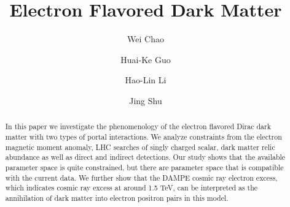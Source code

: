 \documentclass[aps,prd,letterpaper,showpacs,twocolumn,preprintnumbers,floatfix,superscriptaddress]{revtex4-1}
\begin{document}
\title{Electron Flavored Dark Matter}
\author{Wei Chao}
\author{Huai-Ke Guo}
\author{Hao-Lin Li}
\author{Jing Shu}


\begin{abstract}
In this paper we investigate the phenomenology of the electron flavored Dirac dark matter with two types of portal interactions. We analyze constraints from the electron magnetic moment anomaly, LHC searches of singly charged scalar, dark matter relic abundance as well as direct and indirect detections. 
Our study shows that the available parameter space is quite constrained, but there are parameter space that is compatible with the current data.
We further show that the DAMPE cosmic ray electron excess, which indicates cosmic ray excess at around 1.5 TeV, can be interpreted as the annihilation of dark matter into electron positron pairs in this model.
\end{abstract}


\maketitle
\end{document}
